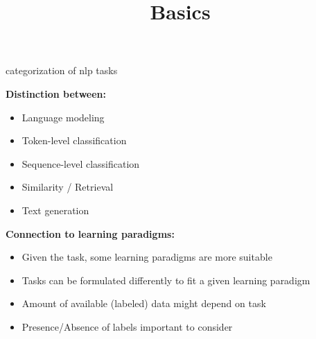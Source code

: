 


\newcommand*\POS[1]{\textsubscript{\texttt{#1}}} %
\usepackage{qtree} %

\newcommand{\titlefigure}{figure/tasks.png}
\newcommand{\learninggoals}{
\item Understand the different types of tasks (low- vs. high-level)
\item Purely Linguistic tasks vs. more general classification tasks}

\title{Basics}
\date{}




\begin{vbframe}{categorization of nlp tasks}

\vfill

\textbf{Distinction between:}

	\begin{itemize}
		\item Language modeling
		\item Token-level classification
		\item Sequence-level classification
		\item Similarity / Retrieval
		\item Text generation
	\end{itemize}
	
\vspace{.3cm}

\textbf{Connection to learning paradigms:}

	\begin{itemize}
		\item Given the task, some learning paradigms are more suitable
		\item Tasks can be formulated differently to fit a given learning paradigm
		\item Amount of available (labeled) data might depend on task
		\item Presence/Absence of labels important to consider
	\end{itemize}

\vfill

\end{vbframe}

